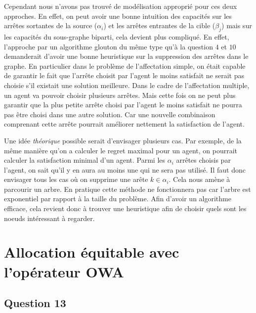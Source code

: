 \documentclass[a4paper, titlepage, oneside, 12pt]{article}%
\begin{document}
Cependant nous n'avons pas trouvé de modélisation approprié pour ces deux approches. En effet, on peut avoir une bonne intuition des capacités sur les arrêtes sortantes de la source ($\alpha_i$) et les arrêtes entrantes de la cible ($\beta_j$) mais sur les capacités du sous-graphe biparti, cela devient plus compliqué. En effet, l'approche par un algorithme glouton du même type qu'à la question $4$ et $10$ demanderait d'avoir une bonne heuristique sur la suppression des arrêtes dans le graphe. En particulier dans le problème de l'affectation simple, on était capable de garantir le fait que l'arrête choisit par l'agent le moins satisfait ne serait pas choisie s'il existait une solution meilleure. Dans le cadre de l'affectation multiple, un agent va pouvoir choisir plusieurs arrêtes. Mais cette fois on ne peut plus garantir que la plus petite arrête choisi par l'agent le moins satisfait ne pourra pas être choisi dans une autre solution. Car une nouvelle  combinaison comprenant cette arrête pourrait améliorer nettement la satisfaction de l'agent.

Une idée \textit{théorique} possible serait d'envisager plusieurs cas. Par exemple, de la même manière qu'on a calculer le regret maximal pour un agent, on pourrait calculer la satisfaction minimal d'un agent. Parmi les $\alpha_i$ arrêtes choisis par l'agent, on sait qu'il y en aura au moins une qui ne sera pas utilisé. Il faut donc envisager tous les cas où on supprime une arête $k\in \alpha_i$. Cela nous amène à parcourir un arbre. En pratique cette méthode ne fonctionnera pas car l'arbre est exponentiel par rapport à la taille du problème. Afin d'avoir un algorithme efficace, cela revient donc à trouver une heuristique afin de choisir quels sont les noeuds intéressant à regarder.

\section{Allocation équitable avec l'opérateur OWA}
\subsection{Question 13}
\end{document}
